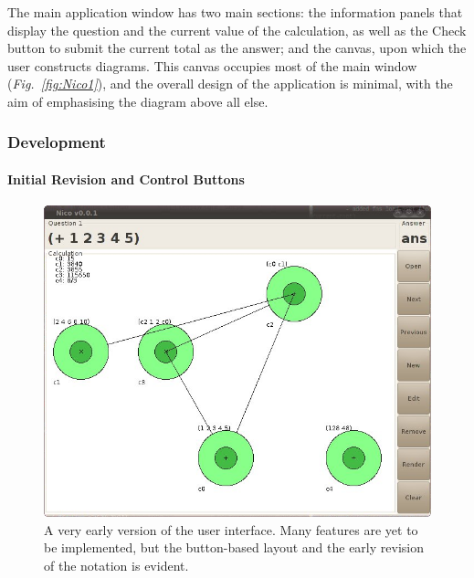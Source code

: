 \documentclass[12pt,twoside,notitlepage,xetex]{report}
\begin{document}
The main application window has two main sections: the information panels that display the question and the current value of the calculation, as well as the {\sfapp Check} button to submit the current total as the answer; and the canvas, upon which the user constructs diagrams.  This canvas occupies most of the main window (\emph{Fig.~\ref{fig:Nico1}}), and the overall design of the application is minimal, with the aim of emphasising the diagram above all else.

\vspace{0.75cm}
\subsubsection{Development}

\paragraph{Initial Revision and Control Buttons}\hfill

\begin{center}
\begin{figure}[H]
\begin{center}
\includegraphics[width=\textwidth-4cm]{figs/nico_screen_oldest.png}
\end{center}
\caption{A very early version of the user interface.  Many features are yet to be implemented, but the button-based layout and the early revision of the notation is evident.}
\label{fig:OldApps1}
\end{figure}
\end{center}
\end{document}
